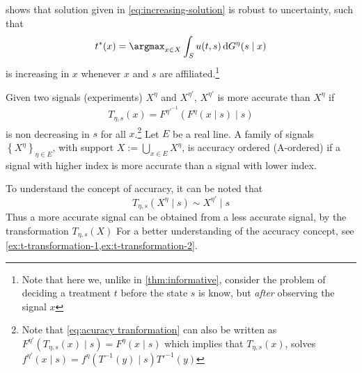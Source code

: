 \documentclass[11pt,a4paper,oneside]{article}
\begin{document}
\textcite{Athey2002}  shows that solution given in \cref{eq:increasing-solution} is robust to uncertainty, such that
\[
	t^*(x)=\argmax_{x\in X}\int_Su(t,s)\dif G^\eta(s\mid x)
\]
is increasing in \(x\)  whenever \(x\) and \(s\) are affiliated.\footnote{Note that here we, unlike in \cref{thm:informative}, consider the problem of deciding a treatment \(t\) before the state \(s\) is know, but \emph{after} observing the signal \(x\) }

\begin{definition}\label{def:accuracy}
\parencite{Persico2000} Given two signals (experiments) \(X^{\eta}\) and \(X^{\eta'}\),  \(X^{\eta'}\) is more accurate than \(X^{\eta}\) if
\begin{align}
    	T_{\eta,s}(x)=F^{\eta'^{-1}}(F^{\eta}(x\mid s)\mid s)\label{eq:acuracy tranformation}
\end{align}
is non decreasing in \(s\) for all \(x\).\footnote{Note that \cref{eq:acuracy tranformation} can also be written as \(F^{\eta'}(T_{\eta,s}(x)\mid s)=F^{\eta}(x\mid s)\) which implies that \(T_{\eta,s}(x)\), solves \(f^{\eta'}(x\mid s)=f^\eta(T^{-1}(y)\mid s)T'^{-1}(y)\)} Let \(E\) be a real line. A family of signals \(\left \{ X^{\eta}\right \} _{\eta\in E}\), with support \(X:=\bigcup_{x\in E}X^\eta\), is accuracy ordered (A-ordered) if a signal with higher index is more accurate than a signal with lower index.
\end{definition}

To understand the concept of accuracy, it can be noted that
\[
	T_{\eta,s}(X^{\eta}\mid s)\sim X^{\eta'}\mid s
\]
Thus a more accurate signal can be obtained from a less accurate signal, by the transformation \(T_{\eta,s}(X)\)  For a better understanding of the accuracy concept, see \cref{ex:t-transformation-1,ex:t-transformation-2}.
\end{document}

